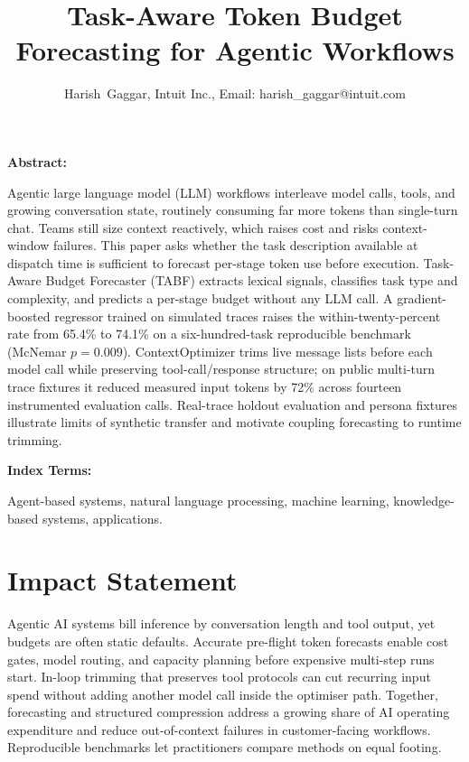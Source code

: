 \documentclass[journal]{IEEEtran}
\renewenvironment{abstract}{%
  \normalfont\normalsize
  \par\noindent\textbf{Abstract:}\space
}{%
  \par\vspace{0.5\baselineskip}%
}
\renewenvironment{IEEEkeywords}{%
  \normalfont\normalsize
  \par\noindent\textbf{Index Terms:}\space
}{%
  \par\vspace{0.5\baselineskip}%
}
\begin{document}
\title{Task-Aware Token Budget Forecasting for Agentic Workflows}

\author{Harish~Gaggar, Intuit Inc., Email: harish\_gaggar@intuit.com}

\markboth{}{}

\maketitle

\begin{abstract}
Agentic large language model (LLM) workflows interleave model calls, tools, and
growing conversation state, routinely consuming far more tokens than single-turn
chat. Teams still size context reactively, which raises cost and risks
context-window failures. This paper asks whether the task description available
at dispatch time is sufficient to forecast per-stage token use before execution.
Task-Aware Budget Forecaster (TABF) extracts lexical signals, classifies task
type and complexity, and predicts a per-stage budget without any LLM call. A
gradient-boosted regressor trained on simulated traces raises the
within-twenty-percent rate from 65.4\% to 74.1\% on a six-hundred-task
reproducible benchmark (McNemar $p=0.009$). ContextOptimizer trims live message
lists before each model call while preserving tool-call/response structure; on
public multi-turn trace fixtures it reduced measured input tokens by 72\%
across fourteen instrumented evaluation calls. Real-trace holdout evaluation and persona
fixtures illustrate limits of synthetic transfer and motivate coupling
forecasting to runtime trimming.
\end{abstract}

\begin{IEEEkeywords}
Agent-based systems, natural language processing, machine learning, knowledge-based systems, applications.
\end{IEEEkeywords}

\section{Impact Statement}
Agentic AI systems bill inference by conversation length and tool
output, yet budgets are often static defaults. Accurate pre-flight token forecasts
enable cost gates, model routing, and capacity planning before expensive
multi-step runs start. In-loop trimming that preserves tool protocols can cut
recurring input spend without adding another model call inside the optimiser path.
Together, forecasting and structured compression address a growing share of AI
operating expenditure and reduce out-of-context failures in customer-facing
workflows. Reproducible benchmarks let practitioners compare methods on equal
footing.
\end{document}
